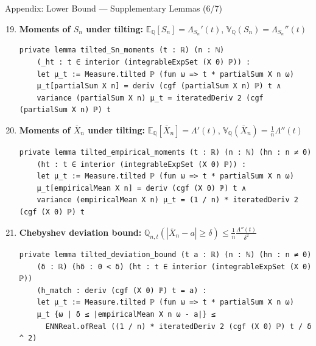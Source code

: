 \documentclass[aspectratio=169]{beamer}
\newcommand{\E}{\mathbb{E}}
\newcommand{\Q}{\mathbb{Q}}
\newcommand{\Var}{\mathbb{V}}
\begin{document}
\begin{frame}[fragile]{Appendix: Lower Bound --- Supplementary Lemmas (6/7)}
  \begin{enumerate}\setcounter{enumi}{18}
    \item \textbf{Moments of $S_n$ under tilting:} $\E_{\Q}[S_n] = \Lambda_{S_n}'(t)$, $\Var_{\Q}(S_n) = \Lambda_{S_n}''(t)$
\begin{lstlisting}[basicstyle=\ttfamily\tiny]
private lemma tilted_Sn_moments (t : ℝ) (n : ℕ)
    (_ht : t ∈ interior (integrableExpSet (X 0) ℙ)) :
    let μ_t := Measure.tilted ℙ (fun ω => t * partialSum X n ω)
    μ_t[partialSum X n] = deriv (cgf (partialSum X n) ℙ) t ∧
    variance (partialSum X n) μ_t = iteratedDeriv 2 (cgf (partialSum X n) ℙ) t
\end{lstlisting}
    \item \textbf{Moments of $\overline{X}_n$ under tilting:} $\E_{\Q}[\overline{X}_n] = \Lambda'(t)$, $\Var_{\Q}(\overline{X}_n) = \frac{1}{n}\Lambda''(t)$
\begin{lstlisting}[basicstyle=\ttfamily\tiny]
private lemma tilted_empirical_moments (t : ℝ) (n : ℕ) (hn : n ≠ 0)
    (ht : t ∈ interior (integrableExpSet (X 0) ℙ)) :
    let μ_t := Measure.tilted ℙ (fun ω => t * partialSum X n ω)
    μ_t[empiricalMean X n] = deriv (cgf (X 0) ℙ) t ∧
    variance (empiricalMean X n) μ_t = (1 / n) * iteratedDeriv 2 (cgf (X 0) ℙ) t
\end{lstlisting}
    \item \textbf{Chebyshev deviation bound:} $\Q_{n,t}(|\overline{X}_n - a| \ge \delta) \le \frac{1}{n}\frac{\Lambda''(t)}{\delta^2}$
\begin{lstlisting}[basicstyle=\ttfamily\tiny]
private lemma tilted_deviation_bound (t a : ℝ) (n : ℕ) (hn : n ≠ 0)
    (δ : ℝ) (hδ : 0 < δ) (ht : t ∈ interior (integrableExpSet (X 0) ℙ))
    (h_match : deriv (cgf (X 0) ℙ) t = a) :
    let μ_t := Measure.tilted ℙ (fun ω => t * partialSum X n ω)
    μ_t {ω | δ ≤ |empiricalMean X n ω - a|} ≤
      ENNReal.ofReal ((1 / n) * iteratedDeriv 2 (cgf (X 0) ℙ) t / δ ^ 2)
\end{lstlisting}
  \end{enumerate}
\end{frame}
\end{document}
